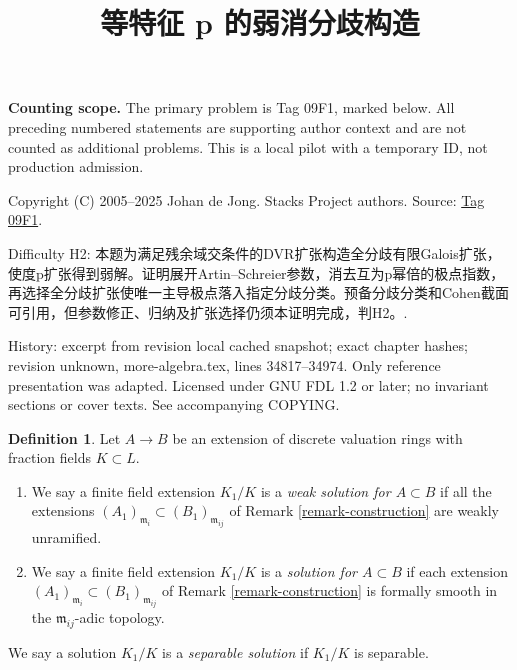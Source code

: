 \documentclass{amsart}
\theoremstyle{plain}
\theoremstyle{definition}
\newtheorem{definition}[subsection]{Definition}
\theoremstyle{remark}
\numberwithin{equation}{subsection}
\begin{document}
\title[Stacks Project, Tag 09F1]{等特征 p 的弱消分歧构造}
\maketitle
\noindent\textbf{Counting scope.} The primary problem is Tag 09F1, marked below. All preceding numbered statements are supporting author context and are not counted as additional problems. This is a local pilot with a temporary ID, not production admission.


\noindent Copyright (C) 2005--2025 Johan de Jong. Stacks Project authors. Source: \href{https://stacks.math.columbia.edu/tag/09F1}{Tag 09F1}.

\noindent Difficulty H2: 本题为满足残余域交条件的DVR扩张构造全分歧有限Galois扩张，使度p扩张得到弱解。证明展开Artin–Schreier参数，消去互为p幂倍的极点指数，再选择全分歧扩张使唯一主导极点落入指定分歧分类。预备分歧分类和Cohen截面可引用，但参数修正、归纳及扩张选择仍须本证明完成，判H2。.

\noindent History: excerpt from revision local cached snapshot; exact chapter hashes; revision unknown, more-algebra.tex, lines 34817--34974. Only reference presentation was adapted. Licensed under GNU FDL 1.2 or later; no invariant sections or cover texts. See accompanying COPYING.

\begin{definition}
\label{definition-solution}
Let $A \to B$ be an extension of discrete valuation rings with fraction
fields $K \subset L$.
\begin{enumerate}
\item We say a finite field extension $K_1/K$ is a
{\it weak solution for $A \subset B$} if all the extensions
$(A_1)_{\mathfrak m_i} \subset (B_1)_{\mathfrak m_{ij}}$ of
Remark \ref{remark-construction} are weakly unramified.
\item We say a finite field extension $K_1/K$ is a
{\it solution for $A \subset B$} if each extension
$(A_1)_{\mathfrak m_i} \subset (B_1)_{\mathfrak m_{ij}}$ of
Remark \ref{remark-construction} is formally smooth in
the $\mathfrak m_{ij}$-adic topology.
\end{enumerate}
We say a solution $K_1/K$ is a {\it separable solution}
if $K_1/K$ is separable.
\end{definition}
\end{document}
